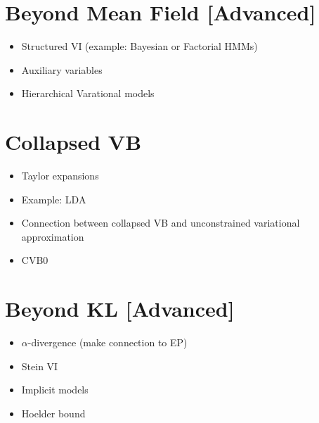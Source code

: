 \documentclass[11pt, a4paper]{article}
\begin{document}
\section{Beyond Mean Field [Advanced]}
\begin{itemize}
\item Structured VI (example: Bayesian or Factorial HMMs)
\item Auxiliary variables
\item Hierarchical Varational models 
\end{itemize}

\section{Collapsed VB}
\begin{itemize}
\item Taylor expansions
\item Example: LDA
\item Connection between collapsed VB and unconstrained variational approximation
\item CVB0
\end{itemize}

\section{Beyond KL [Advanced]}
\begin{itemize}
\item $ \alpha $-divergence (make connection to EP)
\item Stein VI
\item Implicit models
\item Hoelder bound
\end{itemize}
\end{document}
